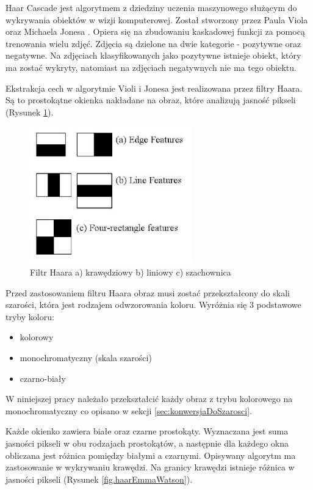 \documentclass[a4paper,twoside,12pt]{book}
\begin{document}
    Haar Cascade jest algorytmem z dziedziny uczenia maszynowego służącym do wykrywania obiektów w wizji komputerowej.
    Został stworzony przez Paula Viola oraz Michaela Jonesa \cite{violaJones}.
    Opiera się na zbudowaniu kaskadowej funkcji za pomocą trenowania wielu zdjęć.
    Zdjęcia są dzielone na
    dwie kategorie - pozytywne oraz negatywne.
    Na zdjęciach klasyfikowanych jako pozytywne istnieje obiekt, który ma zostać wykryty, natomiast
    na zdjęciach negatywnych nie ma tego obiektu.

    Ekstrakcja cech w algorytmie Violi i Jonesa jest realizowana przez filtry Haara.
    Są to prostokątne okienka
    nakładane na obraz, które analizują jasność pikseli (Rysunek \ref{fig.haarRectangles}).
    \begin{figure}
        \centering
        \includegraphics[width=7cm]{Obrazy/Haar_filter_rectangles.jpg}
        \caption{Filtr Haara a) krawędziowy b) liniowy c) szachownica \cite{haar}}
        \label{fig.haarRectangles}
    \end{figure}

    Przed zastosowaniem filtru Haara obraz musi zostać przekształcony do skali szarości, która jest rodzajem
    odwzorowania koloru.
    Wyróżnia się 3 podstawowe tryby koloru:
    \begin{itemize}
        \item kolorowy
        \item monochromatyczny (skala szarości)
        \item czarno-biały
    \end{itemize}
    W niniejszej pracy należało przekształcić każdy obraz z trybu kolorowego na monochromatyczny co opisano w sekcji
    \ref{sec:konwersjaDoSzarosci}.

    Każde okienko zawiera białe oraz czarne prostokąty.
    Wyznaczana jest suma jasności pikseli w obu rodzajach prostokątów, a
    następnie dla każdego okna obliczana jest różnica pomiędzy białymi a czarnymi.
    Opisywany algorytm ma zastosowanie w wykrywaniu krawędzi.
    Na granicy krawędzi istnieje różnica w jasności pikseli
    (Rysunek \ref{fig.haarEmmaWatson}).
\end{document}

